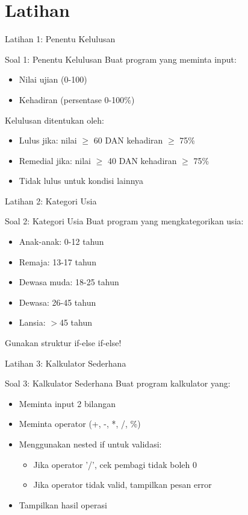 \documentclass{beamer}
\begin{document}
\section{Latihan}
\begin{frame}{Latihan 1: Penentu Kelulusan}
  \begin{block}{Soal 1: Penentu Kelulusan}
    Buat program yang meminta input:
    \begin{itemize}
      \item Nilai ujian (0-100)
      \item Kehadiran (persentase 0-100\%)
    \end{itemize}
    Kelulusan ditentukan oleh:
    \begin{itemize}
      \item Lulus jika: nilai $\geq$ 60 DAN kehadiran $\geq$ 75\%
      \item Remedial jika: nilai $\geq$ 40 DAN kehadiran $\geq$ 75\%
      \item Tidak lulus untuk kondisi lainnya
    \end{itemize}
  \end{block}
\end{frame}

\begin{frame}{Latihan 2: Kategori Usia}
  \begin{block}{Soal 2: Kategori Usia}
    Buat program yang mengkategorikan usia:
    \begin{itemize}
      \item Anak-anak: 0-12 tahun
      \item Remaja: 13-17 tahun  
      \item Dewasa muda: 18-25 tahun
      \item Dewasa: 26-45 tahun
      \item Lansia: $>$45 tahun
    \end{itemize}
    Gunakan struktur if-else if-else!
  \end{block}
\end{frame}

\begin{frame}{Latihan 3: Kalkulator Sederhana}
  \begin{block}{Soal 3: Kalkulator Sederhana}
    Buat program kalkulator yang:
    \begin{itemize}
      \item Meminta input 2 bilangan
      \item Meminta operator (+, -, *, /, \%)
      \item Menggunakan nested if untuk validasi:
        \begin{itemize}
          \item Jika operator '/', cek pembagi tidak boleh 0
          \item Jika operator tidak valid, tampilkan pesan error
        \end{itemize}
      \item Tampilkan hasil operasi
    \end{itemize}
  \end{block}
\end{frame}
\end{document}
